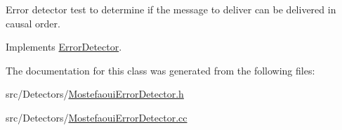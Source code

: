 Error detector test to determine if the message to deliver can be delivered in causal order. 



Implements \hyperlink{class_error_detector_afc717d04768dd207196c08e24163115c}{Error\+Detector}.



The documentation for this class was generated from the following files\+:\begin{DoxyCompactItemize}
\item 
src/\+Detectors/\hyperlink{_mostefaoui_error_detector_8h}{Mostefaoui\+Error\+Detector.\+h}\item 
src/\+Detectors/\hyperlink{_mostefaoui_error_detector_8cc}{Mostefaoui\+Error\+Detector.\+cc}\end{DoxyCompactItemize}
